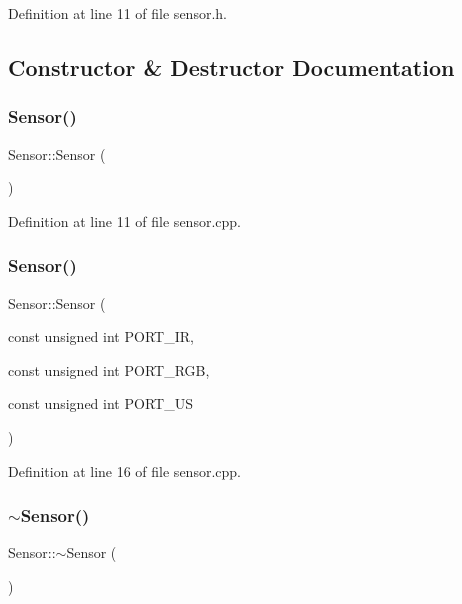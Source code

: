 Definition at line 11 of file sensor.\+h.



\subsection{Constructor \& Destructor Documentation}
\mbox{\label{class_sensor_a342d6d11ef572c8cba92cb76fb1a294b}} 
\subsubsection{\texorpdfstring{Sensor()}{Sensor()}\hspace{0.1cm}{\footnotesize\ttfamily [1/2]}}
{\footnotesize\ttfamily Sensor\+::\+Sensor (\begin{DoxyParamCaption}{ }\end{DoxyParamCaption})}



Definition at line 11 of file sensor.\+cpp.

\mbox{\label{class_sensor_a47122c90fb62cd4510af51161058953d}} 
\subsubsection{\texorpdfstring{Sensor()}{Sensor()}\hspace{0.1cm}{\footnotesize\ttfamily [2/2]}}
{\footnotesize\ttfamily Sensor\+::\+Sensor (\begin{DoxyParamCaption}\item[{const unsigned int}]{P\+O\+R\+T\+\_\+\+IR,  }\item[{const unsigned int}]{P\+O\+R\+T\+\_\+\+R\+GB,  }\item[{const unsigned int}]{P\+O\+R\+T\+\_\+\+US }\end{DoxyParamCaption})}



Definition at line 16 of file sensor.\+cpp.

\mbox{\label{class_sensor_aee8c70e7ef05ce65e7ee33686b5d7db2}} 
\subsubsection{\texorpdfstring{$\sim$\+Sensor()}{~Sensor()}}
{\footnotesize\ttfamily Sensor\+::$\sim$\+Sensor (\begin{DoxyParamCaption}{ }\end{DoxyParamCaption})}




